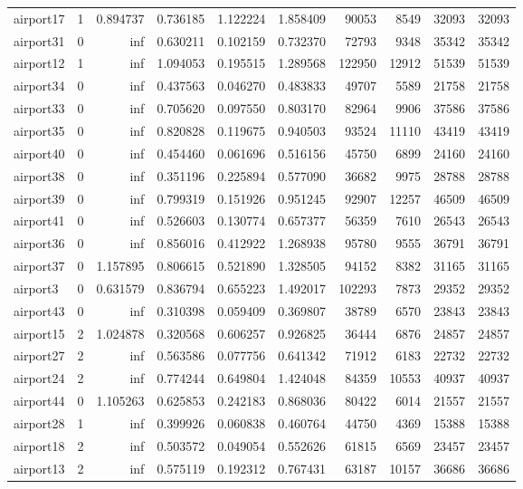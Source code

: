 \begin{longtable}{|l|r|r|r|r|r|r|r|r|r|}
airport17 & 1 & 0.894737 & 0.736185 & 1.122224 & 1.858409 & 90053 & 8549 & 32093 & 32093 \\
airport31 & 0 & inf & 0.630211 & 0.102159 & 0.732370 & 72793 & 9348 & 35342 & 35342 \\
airport12 & 1 & inf & 1.094053 & 0.195515 & 1.289568 & 122950 & 12912 & 51539 & 51539 \\
airport34 & 0 & inf & 0.437563 & 0.046270 & 0.483833 & 49707 & 5589 & 21758 & 21758 \\
airport33 & 0 & inf & 0.705620 & 0.097550 & 0.803170 & 82964 & 9906 & 37586 & 37586 \\
airport35 & 0 & inf & 0.820828 & 0.119675 & 0.940503 & 93524 & 11110 & 43419 & 43419 \\
airport40 & 0 & inf & 0.454460 & 0.061696 & 0.516156 & 45750 & 6899 & 24160 & 24160 \\
airport38 & 0 & inf & 0.351196 & 0.225894 & 0.577090 & 36682 & 9975 & 28788 & 28788 \\
airport39 & 0 & inf & 0.799319 & 0.151926 & 0.951245 & 92907 & 12257 & 46509 & 46509 \\
airport41 & 0 & inf & 0.526603 & 0.130774 & 0.657377 & 56359 & 7610 & 26543 & 26543 \\
airport36 & 0 & inf & 0.856016 & 0.412922 & 1.268938 & 95780 & 9555 & 36791 & 36791 \\
airport37 & 0 & 1.157895 & 0.806615 & 0.521890 & 1.328505 & 94152 & 8382 & 31165 & 31165 \\
airport3 & 0 & 0.631579 & 0.836794 & 0.655223 & 1.492017 & 102293 & 7873 & 29352 & 29352 \\
airport43 & 0 & inf & 0.310398 & 0.059409 & 0.369807 & 38789 & 6570 & 23843 & 23843 \\
airport15 & 2 & 1.024878 & 0.320568 & 0.606257 & 0.926825 & 36444 & 6876 & 24857 & 24857 \\
airport27 & 2 & inf & 0.563586 & 0.077756 & 0.641342 & 71912 & 6183 & 22732 & 22732 \\
airport24 & 2 & inf & 0.774244 & 0.649804 & 1.424048 & 84359 & 10553 & 40937 & 40937 \\
airport44 & 0 & 1.105263 & 0.625853 & 0.242183 & 0.868036 & 80422 & 6014 & 21557 & 21557 \\
airport28 & 1 & inf & 0.399926 & 0.060838 & 0.460764 & 44750 & 4369 & 15388 & 15388 \\
airport18 & 2 & inf & 0.503572 & 0.049054 & 0.552626 & 61815 & 6569 & 23457 & 23457 \\
airport13 & 2 & inf & 0.575119 & 0.192312 & 0.767431 & 63187 & 10157 & 36686 & 36686 \\

\end{longtable}
